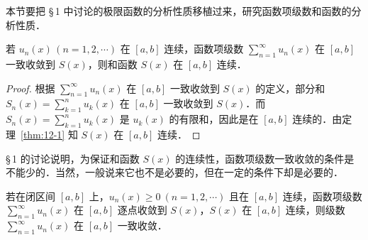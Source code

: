 本节要把 \S\,1 中讨论的极限函数的分析性质移植过来，研究函数项级数和函数的分析性质．

\begin{theorem}[和函数的连续性]\label{thm:12-9}
若 $u_{n}(x)\,(n=1,2,\cdots)$ 在 $[a,b]$ 连续，函数项级数 $\displaystyle\sum_{n=1}^{\infty}u_{n}(x)$ 在 $[a,b]$ 一致收敛到 $S(x)$，则和函数 $S(x)$ 在 $[a,b]$ 连续．
\end{theorem}

\begin{proof}
根据 $\displaystyle\sum_{n=1}^{\infty}u_{n}(x)$ 在 $[a,b]$ 一致收敛到 $S(x)$ 的定义，部分和 $S_{n}(x)=\displaystyle\sum_{k=1}^{n}u_{k}(x)$ 在 $[a,b]$ 一致收敛到 $S(x)$．而 $S_{n}(x)=\displaystyle\sum_{k=1}^{n}u_{k}(x)$ 是 $u_{k}(x)$ 的有限和，因此是在 $[a,b]$ 连续的．由定理~\ref{thm:12-1} 知 $S(x)$ 在 $[a,b]$ 连续．
\end{proof}

\S\,1 的讨论说明，为保证和函数 $S(x)$ 的连续性，函数项级数一致收敛的条件是不能少的．当然，一般说来它也不是必要的，但在一定的条件下却是必要的．

\begin{theorem}[迪尼 Dini]\label{thm:12-10}
若在闭区间 $[a,b]$ 上，$u_{n}(x)\geqslant 0\ (n=1,2,\cdots)$ 且在 $[a,b]$ 连续，函数项级数 $\displaystyle\sum_{n=1}^{\infty}u_{n}(x)$ 在 $[a,b]$ 逐点收敛到 $S(x)$，$S(x)$ 在 $[a,b]$ 连续，则级数 $\displaystyle\sum_{n=1}^{\infty}u_{n}(x)$ 在 $[a,b]$ 一致收敛．
\end{theorem}


